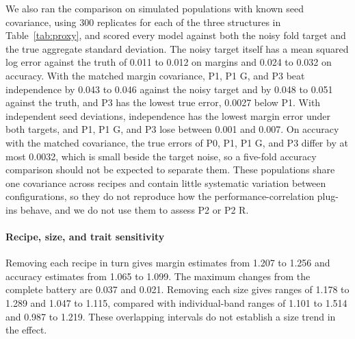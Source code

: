 We also ran the comparison on simulated populations with known seed covariance, using 300 replicates for each of the three structures in Table~\ref{tab:proxy}, and scored every model against both the noisy fold target and the true aggregate standard deviation. The noisy target itself has a mean squared log error against the truth of 0.011 to 0.012 on margins and 0.024 to 0.032 on accuracy. With the matched margin covariance, P1, P1 G, and P3 beat independence by 0.043 to 0.046 against the noisy target and by 0.048 to 0.051 against the truth, and P3 has the lowest true error, 0.0027 below P1. With independent seed deviations, independence has the lowest margin error under both targets, and P1, P1 G, and P3 lose between 0.001 and 0.007. On accuracy with the matched covariance, the true errors of P0, P1, P1 G, and P3 differ by at most 0.0032, which is small beside the target noise, so a five-fold accuracy comparison should not be expected to separate them. These populations share one covariance across recipes and contain little systematic variation between configurations, so they do not reproduce how the performance-correlation plug-ins behave, and we do not use them to assess P2 or P2 R.

\paragraph{Recipe, size, and trait sensitivity}
Removing each recipe in turn gives margin estimates from 1.207 to 1.256 and accuracy estimates from 1.065 to 1.099. The maximum changes from the complete battery are 0.037 and 0.021. Removing each size gives ranges of 1.178 to 1.289 and 1.047 to 1.115, compared with individual-band ranges of 1.101 to 1.514 and 0.987 to 1.219. These overlapping intervals do not establish a size trend in the effect.

